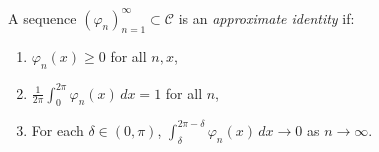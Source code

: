 A sequence $(\varphi_n)_{n=1}^{\infty} \subset \mathcal{C}$ is an \textit{approximate identity} if:
\begin{enumerate}
\item $\varphi_n(x) \geq 0$ for all $n, x$,
\item $\frac{1}{2\pi} \int_0^{2\pi} \varphi_n(x)\,dx = 1$ for all $n$,
\item For each $\delta \in (0, \pi)$, $\int_\delta^{2\pi-\delta} \varphi_n(x)\,dx \to 0$ as $n \to \infty$.
\end{enumerate}
